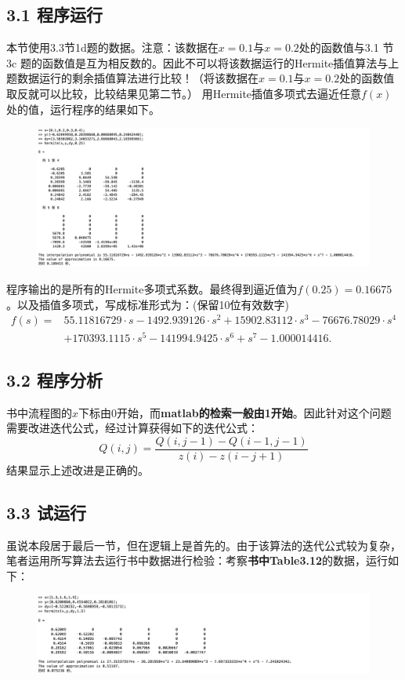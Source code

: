 \documentclass{article}
\begin{document}
\subsection{3.1 程序运行}

    本节使用3.3节1d题的数据。注意：该数据在$x=0.1$与$x=0.2$处的函数值与3.1 节 3c 题的函数值是互为相反数的。因此不可以将该数据运行的Hermite插值算法与上题数据运行的剩余插值算法进行比较！（将该数据在$x=0.1$与$x=0.2$处的函数值取反就可以比较，比较结果见第二节。）
    用Hermite插值多项式去逼近任意$f(x)$处的值，运行程序的结果如下。
    \begin{figure}[h]
    \centering
    \includegraphics[scale=0.4]{Programme2}
    \end{figure}

    程序输出的是所有的Hermite多项式系数。最终得到逼近值为$f(0.25)=0.16675$。以及插值多项式，写成标准形式为：(保留10位有效数字)
    \begin{align*}
    f(s)=&55.11816729\cdot s - 1492.939126\cdot s^2 + 15902.83112\cdot s^3 - 76676.78029\cdot s^4 \\
    &+ 170393.1115\cdot s^5 - 141994.9425\cdot s^6 + s^7 - 1.000014416.
    \end{align*}

\subsection{3.2 程序分析}
    书中流程图的$x$下标由0开始，而\textbf{matlab的检索一般由1开始}。因此针对这个问题需要改进迭代公式，经过计算获得如下的迭代公式：
    $$Q(i,j)=\frac{Q(i,j-1)-Q(i-1,j-1)}{z(i)-z(i-j+1)}
    $$
    结果显示上述改进是正确的。

\subsection{3.3 试运行}
    虽说本段居于最后一节，但在逻辑上是首先的。由于该算法的迭代公式较为复杂，笔者运用所写算法去运行书中数据进行检验：考察\textbf{书中Table3.12}的数据，运行如下：
    \begin{figure}[h]
    \centering
    \includegraphics[scale=0.4]{Programme3}
    \end{figure}
\end{document}

